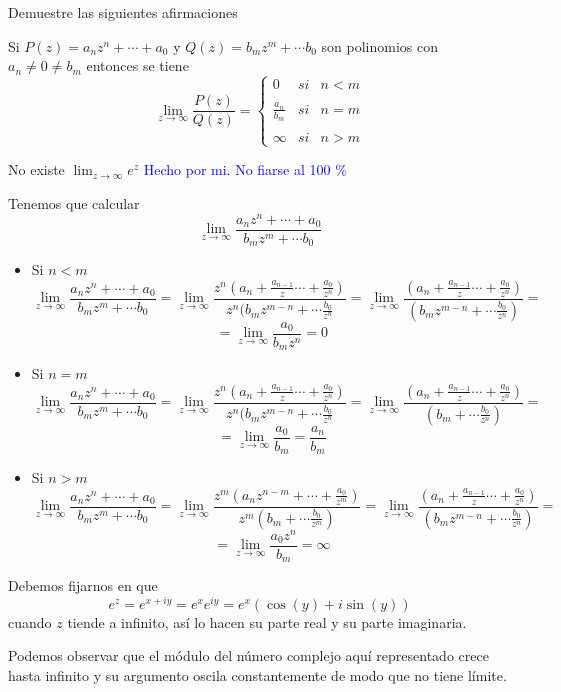 \begin{problem}[5]
Demuestre las siguientes afirmaciones
\ppart

Si $P(z)=a_nz^n+\cdots + a_0$ y $Q(z)=b_mz^m+\cdots b_0$ son polinomios con $a_n \neq 0 \neq b_m$ entonces se tiene
\[\lim_{z \to \infty} \frac{P(z)}{Q(z)} = \left\{
\begin{array}{lcc}
    0& si & n < m \\
    \\ \frac{a_n}{b_m} & si & n=m \\
 \\ \infty & si & n > m
 \end{array} \right.\]

\ppart
No existe $\lim_{z \to \infty}e^z$
\solution
\textcolor{blue}{Hecho por mi. No fiarse al 100 \%}

\spart
Tenemos que calcular
\[\lim_{z \to \infty}\frac{a_nz^n+\cdots + a_0}{b_mz^m+\cdots b_0}\]
\begin{itemize}
\item Si $n<m$
\[\lim_{z \to \infty}\frac{a_nz^n+\cdots + a_0}{b_mz^m+\cdots b_0} = \lim_{z \to \infty}\frac{z^n(a_n+\frac{a_{n-1}}{z}\cdots + \frac{a_0}{z^n})}{z^n(b_mz^{m-n}+\cdots \frac{b_0}{z^n}}=\lim_{z \to \infty}\frac{(a_n+\frac{a_{n-1}}{z}\cdots + \frac{a_0}{z^n})}{(b_mz^{m-n}+\cdots \frac{b_0}{z^n})} = \]
\[=\lim_{z \to \infty}\frac{a_0}{b_mz^n} = 0\]

\item
Si $n=m$
\[\lim_{z \to \infty}\frac{a_nz^n+\cdots + a_0}{b_mz^m+\cdots b_0} = \lim_{z \to \infty}\frac{z^n(a_n+\frac{a_{n-1}}{z}\cdots + \frac{a_0}{z^n})}{z^n(b_mz^{m-n}+\cdots \frac{b_0}{z^n}}=\lim_{z \to \infty}\frac{(a_n+\frac{a_{n-1}}{z}\cdots + \frac{a_0}{z^n})}{(b_m+\cdots \frac{b_0}{z^n})} = \]
\[=\lim_{z \to \infty}\frac{a_0}{b_m} = \frac{a_n}{b_m}\]

\item Si $n>m$
\[\lim_{z \to \infty}\frac{a_nz^n+\cdots + a_0}{b_mz^m+\cdots b_0} = \lim_{z \to \infty}\frac{z^m(a_nz^{n-m}+\cdots + \frac{a_0}{z^m})}{z^m(b_m+\cdots \frac{b_0}{z^m})}=\lim_{z \to \infty}\frac{(a_n+\frac{a_{n-1}}{z}\cdots + \frac{a_0}{z^n})}{(b_mz^{m-n}+\cdots \frac{b_0}{z^n})} = \]
\[=\lim_{z \to \infty}\frac{a_0z^n}{b_m} = \infty\]
\end{itemize}

\spart

Debemos fijarnos en que
\[e^z=e^{x+iy}=e^xe^{iy}=e^x\left(\cos(y)+i\sin(y)\right)\]
cuando $z$ tiende a infinito, así lo hacen su parte real y su parte imaginaria.

Podemos observar que el módulo del número complejo aquí representado crece hasta infinito y su argumento oscila constantemente de modo que no tiene límite.

\end{problem}

